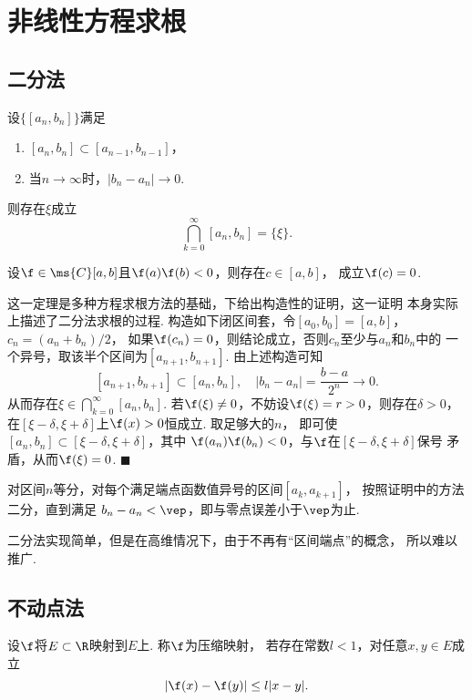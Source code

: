 \section{非线性方程求根}
\subsection{二分法}
  \begin{thm}[闭区间套定理]
    设$\{[a_n, b_n]\}$满足
    \begin{enumerate}
      \item $[a_n, b_n] \subset [a_{n-1}, b_{n-1}]$，
      \item 当$n\to\infty$时，$|b_n - a_n|\to 0$.
    \end{enumerate}
    则存在$\xi$成立
    \[
      \bigcap_{k=0}^{\infty}[a_n, b_n] = \{\xi\}.
    \]
  \end{thm}

  \begin{thm}[连续函数零点定理]
    \label{thm: 连续函数零点定理}
    设$\f\in\ms{C}[a, b]$且$\f(a)\f(b)<0$，则存在$c\in[a, b]$，
    成立$\f(c) = 0$.
  \end{thm}
  \remark
    这一定理是多种方程求根方法的基础，下给出构造性的证明，这一证明
    本身实际上描述了二分法求根的过程.
  \proof
    构造如下闭区间套，令$[a_0, b_0]=[a, b]$，$c_n=(a_n+b_n)/2$，
    如果$\f(c_n)=0$，则结论成立，否则$c_n$至少与$a_n$和$b_n$中的
    一个异号，取该半个区间为$[a_{n+1}, b_{n+1}]$. 由上述构造可知
    \[
      [a_{n+1}, b_{n+1}]\subset[a_n,b_n],\quad
      |b_n - a_n| = \frac{b-a}{2^n}\to 0.
    \]
    从而存在$\xi\in\bigcap_{k=0}^\infty[a_n, b_n]$.
    若$\f(\xi)\ne 0$，不妨设$\f(\xi) = r>0$，则存在$\delta>0$，
    在$[\xi-\delta,\xi+\delta]$上$\f(x)>0$恒成立. 取足够大的$n$，
    即可使$[a_n,b_n]\subset[\xi-\delta,\xi+\delta]$，其中
    $\f(a_n)\f(b_n)<0$，与$\f$在$[\xi-\delta,\xi+\delta]$保号
    矛盾，从而$\f(\xi)=0$. $\blacksquare$

  \begin{alg}[二分法求解零点]
    对区间$n$等分，对每个满足端点函数值异号的区间$[a_k,a_{k+1}]$，
    按照证明中的方法二分，直到满足
    $b_n-a_n<\vep$，即与零点误差小于$\vep$为止.
  \end{alg}
  \remark
    二分法实现简单，但是在高维情况下，由于不再有“区间端点”的概念，
    所以难以推广.

\subsection{不动点法}
  \begin{defi}[压缩映射]
    设$\f$将$E\subset\R$映射到$E$上. 称$\f$为压缩映射，
    若存在常数$l<1$，对任意$x,y\in E$成立
    \[
      |\f(x) - \f(y)| \le l|x-y|.
    \]
  \end{defi}

